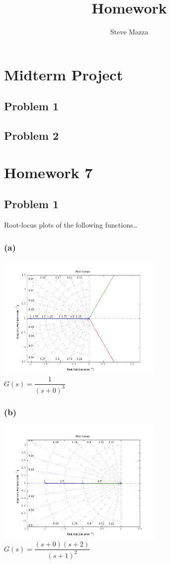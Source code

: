 \documentclass[letterpaper,10pt]{article}
\title{Homework}
\author{Steve Mazza}
\begin{document}
\maketitle

\section*{Midterm Project}
\subsection*{Problem 1}

\subsection*{Problem 2}

\section*{Homework 7}
\subsection*{Problem 1}
Root-locus plots of the following functions\dots
\subsubsection*{(a)}
\begin{center}
    \includegraphics[width=0.6\textwidth]{homework04-7-1-a.png} \\
   $G(s) = \dfrac{1}{(s+0)^{3}}$
\end{center}
\subsubsection*{(b)}
\begin{center}
    \includegraphics[width=0.6\textwidth]{homework04-7-1-b.png} \\
   $G(s) = \dfrac{(s+0)(s+2)}{(s+1)^{2}}$
\end{center}
\end{document}

